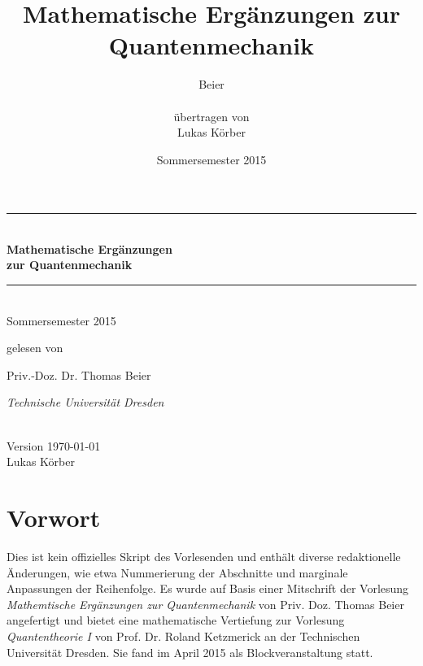\documentclass[a4paper,12pt,portrait]{book}
\title{Mathematische Erg\"anzungen zur Quantenmechanik}
\author{Beier\\ \\ \"ubertragen von\\Lukas K\"orber}
\date{Sommersemester 2015}
\numberwithin{equation}{section}
\begin{document}
\begin{titlepage}
	\centering %
	\vspace*{\baselineskip} %
	
	\rule{\textwidth}{1.6pt}\\[\baselineskip] %
	
	{\LARGE\bfseries Mathematische Ergänzungen \\[0.3\baselineskip] zur Quantenmechanik}\\[0.8\baselineskip] %
	
	\rule{\textwidth}{1.6pt}\\[\baselineskip] %
	
	Sommersemester 2015\par %
	
	\vspace*{2\baselineskip} %
	
	gelesen von\\[\baselineskip]
	{\Large Priv.-Doz. Dr. Thomas Beier\\[0.3\baselineskip]\par} %
	{\itshape Technische Universität Dresden\par} %
	
	\vfill %
	
	\ \\[0.3\baselineskip] %
	{ Version \today} \\[0.3\baselineskip] %
	{\large Lukas Körber}\par %
\end{titlepage}


\begingroup
\renewcommand{\cleardoublepage}{}
\renewcommand{\clearpage}{}
\chapter*{Vorwort}\label{chap:ack}
Dies ist kein offizielles Skript des Vorlesenden und enthält diverse redaktionelle Änderungen, wie etwa Nummerierung der Abschnitte und marginale Anpassungen der Reihenfolge. Es wurde auf Basis einer Mitschrift der Vorlesung \textit{Mathemtische Ergänzungen zur Quantenmechanik} von Priv. Doz. Thomas Beier angefertigt und bietet eine mathematische Vertiefung zur Vorlesung \textit{Quantentheorie I} von Prof. Dr. Roland Ketzmerick an der Technischen Universität Dresden. Sie fand im April 2015 als Blockveranstaltung statt.
\end{document}

